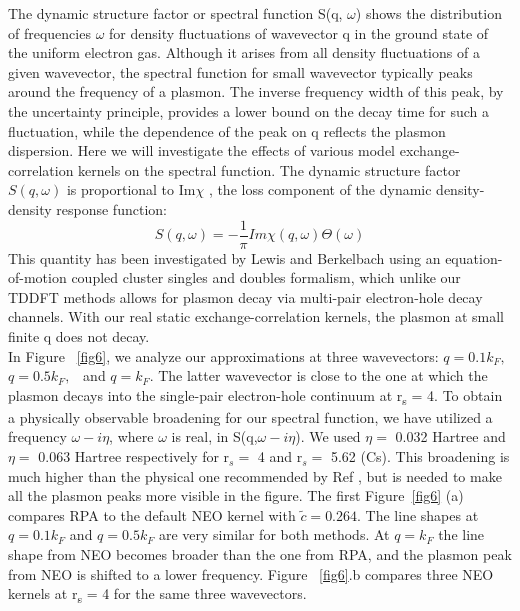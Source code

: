 \documentclass[aps,amsmath,amssymb, preprint, 12pt]{revtex4-1}
\begin{document}
The dynamic structure factor \cite{LP77} or spectral function S(q, $\omega$) shows the distribution of frequencies $\omega$ for density fluctuations of wavevector q in the ground state of the uniform electron gas. Although it arises from all density fluctuations of a given wavevector, the spectral function for small wavevector typically peaks around the frequency of a plasmon. The inverse frequency width of this peak, by the uncertainty principle, provides a lower bound on the decay time for such a fluctuation, while the dependence of the peak on q reflects the plasmon dispersion. Here we will investigate the effects of various model exchange-correlation kernels on the spectral function. The dynamic structure factor  \( S \left( q, \omega  \right)  \)  is proportional to  Im\(\chi\)  \cite{JP85}, the loss component of the dynamic density-density response function:
\begin{equation}
S (q, \omega) = -\frac{1}{\pi} Im\chi(q, \omega) \Theta({\omega})
\end{equation}
This quantity has been investigated by Lewis and Berkelbach \cite{LB19} using an equation-of-motion coupled cluster singles and doubles formalism, which unlike our TDDFT methods allows for plasmon decay via multi-pair electron-hole decay channels. With our real static exchange-correlation kernels, the plasmon at small finite q does not decay.\\

In Figure ~\ref{fig6}, we analyze our approximations at three wavevectors:  \( q=0.1k_{F}, \)   \( q=0.5k_{F}, \) \  and  \( q=k_{F}. \)  The latter wavevector is close to the one at which the plasmon decays into the single-pair electron-hole continuum at r\textsubscript{s} = 4. {\color{red}To obtain a physically observable broadening for our spectral function, we have utilized a frequency $\omega-i\eta$, where $\omega$ is real, in S(q,$\omega-i\eta$). We used $\eta =$ 0.032 Hartree and $\eta =$ 0.063 Hartree respectively for r$_s =$ 4 and r$_s =$ 5.62 (Cs). This broadening is much higher than the physical one recommended by Ref \cite{VUC97}, but is needed to make all the plasmon peaks more visible in the figure.} The first Figure~\ref{fig6} (a) compares RPA to the default NEO kernel with  \( \widetilde{c}=0.264. \)  The line shapes at  \( q=0.1k_{F} \)  and  \( q=0.5k_{F} \)  are very similar for both methods. At  \( q=k_{F} \)  the line shape from NEO becomes broader than the one from RPA, and the plasmon peak from NEO is shifted to a lower frequency. Figure ~\ref{fig6}.b compares three NEO kernels at r\textsubscript{s} = 4 for the same three wavevectors.\\
\end{document}
